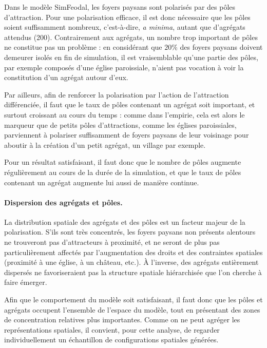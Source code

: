 Dans le modèle SimFeodal, les foyers paysans sont polarisés par des pôles d'attraction.
Pour une polarisation efficace, il est donc nécessaire que les pôles soient suffisamment nombreux, c'est-à-dire, \textit{a minima}, autant que d'agrégats attendus (200).
Contrairement aux agrégats, un nombre trop important de pôles ne constitue pas un problème :
	en considérant que $20\%$ des foyers paysans doivent demeurer isolés en fin de simulation, il est vraisemblable qu'une partie des pôles, par exemple composés d'une église paroissiale, n'aient pas vocation à voir la constitution d'un agrégat autour d'eux.

Par ailleurs, afin de renforcer la polarisation par l'action de l'attraction différenciée, il faut que le taux de pôles contenant un agrégat soit important, et surtout croissant au cours du temps :
comme dans l'empirie, cela est alors le marqueur que de petits pôles d'attractions, comme les églises paroissiales, parviennent à polariser suffisamment de foyers paysans de leur voisinage pour aboutir à la création d'un petit agrégat, un village par exemple.

Pour un résultat satisfaisant, il faut donc que le nombre de pôles augmente régulièrement au cours de la durée de la simulation, et que le taux de pôles contenant un agrégat augmente lui aussi de manière continue.

\paragraph{Dispersion des agrégats et pôles.}\label{par:polarisation-dispersion}

La distribution spatiale des agrégats et des pôles est un facteur majeur de la polarisation.
S'ils sont très concentrés, les foyers paysans non présents alentours ne trouveront pas d'attracteurs à proximité, et ne seront de plus pas particulièrement affectés par l'augmentation des droits et des contraintes spatiales (proximité à une église, à un château, etc.).
À l'inverse, des agrégats entièrement dispersés ne favoriseraient pas la structure spatiale hiérarchisée que l'on cherche à faire émerger.

Afin que le comportement du modèle soit satisfaisant, il faut donc que les pôles et agrégats occupent l'ensemble de l'espace du modèle, tout en présentant des zones de concentration relatives plus importantes.
Comme on ne peut agréger les représentations spatiales, il convient, pour cette analyse, de regarder individuellement un échantillon de configurations spatiales générées.

